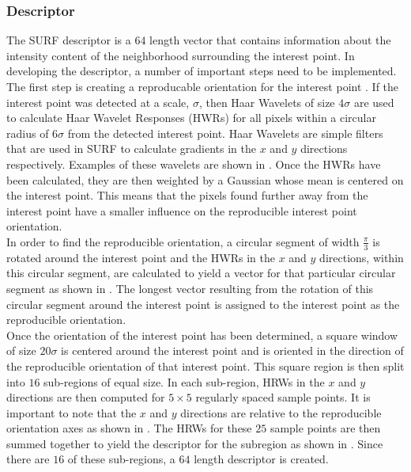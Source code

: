 \documentclass{article}
\begin{document}
\subsubsection{Descriptor}
\label{2dsurfdescribe}
The SURF descriptor is a $64$ length vector that contains information about the intensity content of the neighborhood surrounding the interest point. In developing the descriptor, a number of important steps need to be implemented. The first step is creating a reproducable orientation for the interest point \cite{Bay2008}. If the interest point was detected at a scale, $\sigma$, then Haar Wavelets of size $4\sigma$ are used to calculate Haar Wavelet Responses (HWRs) for all pixels within a circular radius of $6\sigma$ from the detected interest point.  Haar Wavelets are simple filters that are used in SURF to calculate gradients in the $x$ and $y$ directions respectively. Examples of these wavelets are shown in . Once the HWRs have been calculated, they are then weighted by a Gaussian whose mean is centered on the interest point. This means that the pixels found further away from the interest point have a smaller influence on the reproducible interest point orientation.\\

In order to find the reproducible orientation, a circular segment of width $\frac{\pi}{3}$ is rotated around the interest point and the HWRs in the $x$ and $y$ directions, within this circular segment, are calculated to yield a vector for that particular circular segment as shown in . The longest vector resulting from the rotation of this circular segment around the interest point is assigned to the interest point as the reproducible orientation.\\

Once the orientation of the interest point has been determined, a square window of size $20\sigma$ is centered around the interest point and is oriented in the direction of the reproducible orientation of that interest point. This square region is then split into $16$ sub-regions of equal size. In each sub-region, HRWs in the $x$ and $y$ directions are then computed for $5 \times 5$ regularly spaced sample points. It is important to note that the $x$ and $y$ directions are relative to the reproducible orientation axes as shown in . The HRWs for these $25$ sample points are then summed together to yield the descriptor for the subregion as shown in . Since there are $16$ of these sub-regions, a $64$ length descriptor is created.\\
\end{document}
